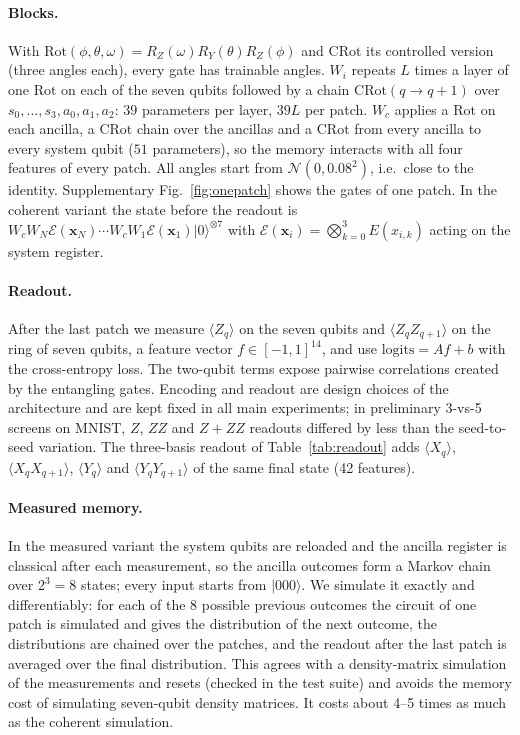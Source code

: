 \documentclass[11pt]{article}
\begin{document}
\paragraph{Blocks.}
With $\mathrm{Rot}(\phi,\theta,\omega)=R_Z(\omega)R_Y(\theta)R_Z(\phi)$ and $\mathrm{CRot}$ its controlled version (three angles each), every gate has trainable angles. $W_i$ repeats $L$ times a layer of one $\mathrm{Rot}$ on each of the seven qubits followed by a chain $\mathrm{CRot}(q\!\to\!q{+}1)$ over $s_0,\dots,s_3,a_0,a_1,a_2$: $39$ parameters per layer, $39L$ per patch. $W_c$ applies a $\mathrm{Rot}$ on each ancilla, a $\mathrm{CRot}$ chain over the ancillas and a $\mathrm{CRot}$ from every ancilla to every system qubit ($51$ parameters), so the memory interacts with all four features of every patch. All angles start from $\mathcal{N}(0,0.08^2)$, i.e.\ close to the identity. Supplementary Fig.~\ref{fig:onepatch} shows the gates of one patch. In the coherent variant the state before the readout is $W_cW_N\mathcal{E}(\mathbf{x}_N)\cdots W_cW_1\mathcal{E}(\mathbf{x}_1)\lvert0\rangle^{\otimes7}$ with $\mathcal{E}(\mathbf{x}_i)=\bigotimes_{k=0}^{3}E(x_{i,k})$ acting on the system register.

\paragraph{Readout.}
After the last patch we measure $\langle Z_q\rangle$ on the seven qubits and $\langle Z_qZ_{q+1}\rangle$ on the ring of seven qubits, a feature vector $f\in[-1,1]^{14}$, and use $\mathrm{logits}=Af+b$ with the cross-entropy loss. The two-qubit terms expose pairwise correlations created by the entangling gates. Encoding and readout are design choices of the architecture and are kept fixed in all main experiments; in preliminary 3-vs-5 screens on MNIST, $Z$, $ZZ$ and $Z{+}ZZ$ readouts differed by less than the seed-to-seed variation. The three-basis readout of Table~\ref{tab:readout} adds $\langle X_q\rangle$, $\langle X_qX_{q+1}\rangle$, $\langle Y_q\rangle$ and $\langle Y_qY_{q+1}\rangle$ of the same final state (42 features).

\paragraph{Measured memory.}
In the measured variant the system qubits are reloaded and the ancilla register is classical after each measurement, so the ancilla outcomes form a Markov chain over $2^3=8$ states; every input starts from $\lvert000\rangle$. We simulate it exactly and differentiably: for each of the 8 possible previous outcomes the circuit of one patch is simulated and gives the distribution of the next outcome, the distributions are chained over the patches, and the readout after the last patch is averaged over the final distribution. This agrees with a density-matrix simulation of the measurements and resets (checked in the test suite) and avoids the memory cost of simulating seven-qubit density matrices. It costs about 4--5 times as much as the coherent simulation.
\end{document}

